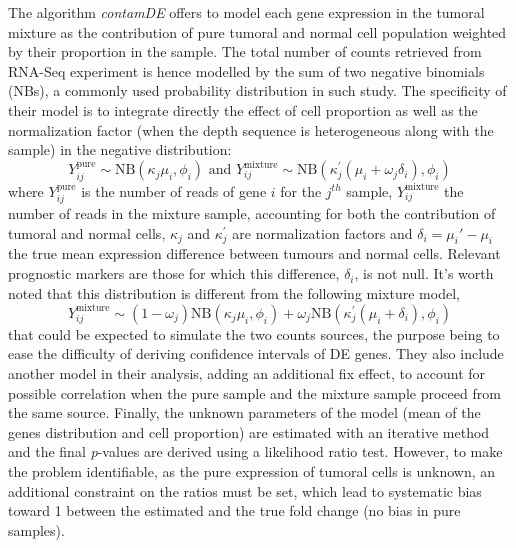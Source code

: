 The algorithm \emph{contamDE} \autocite{shen_etal16} offers to model each gene expression in the tumoral
mixture as the contribution of pure tumoral and normal cell population
weighted by their proportion in the sample. The total number of counts
retrieved from \acrshort{RNA-Seq} experiment is hence modelled by the sum of two
negative binomials (NBs), a commonly used probability distribution in
such study. The specificity of their model is to integrate directly the
effect of cell proportion as well as the normalization factor (when the
depth sequence is heterogeneous along with the sample) in the negative
distribution: \[
Y_{ij}^{\text{pure}} \sim \text{NB} (\kappa_j \mu_i, \phi_i) \text{ and } Y_{ij}^{\text{mixture}} \sim \text{NB} (\kappa_j^{'} \left( \mu_i + \omega_j \delta_i\right) , \phi_i)
\] where \(Y_{ij}^{\text{pure}}\) is the number of reads of gene \(i\)
for the \(j^{th}\) sample, \(Y_{ij}^{\text{mixture}}\) the number of
reads in the mixture sample, accounting for both the contribution of
tumoral and normal cells, \(\kappa_j\) and \(\kappa_j^{'}\) are
normalization factors and \(\delta_i = \mu_i' - \mu_i\) the true mean
expression difference between tumours and normal cells. Relevant
prognostic markers are those for which this difference, \(\delta_i\), is
not null. It's worth noted that this distribution is different from the
following mixture model, 
\[
Y_{ij}^{\text{mixture}} \sim (1 - \omega_j) \text{NB} (\kappa_j \mu_i, \phi_i) + \omega_j \text{NB} (\kappa_j^{'} \left( \mu_i + \delta_i\right) , \phi_i)
\] 
that could be expected to simulate the two counts sources, the
purpose being to ease the difficulty of deriving confidence intervals of
DE genes. They also include another model in their analysis, adding an
additional fix effect, to account for possible correlation when the pure
sample and the mixture sample proceed from the same source. Finally, the
unknown parameters of the model (mean of the genes distribution and cell
proportion) are estimated with an iterative method and the final
\emph{p}-values are derived using a likelihood ratio test. However, to
make the problem identifiable, as the pure expression of tumoral cells
is unknown, an additional constraint on the ratios must be set, which
lead to systematic bias toward 1 between the estimated and the true fold
change (no bias in pure samples).

